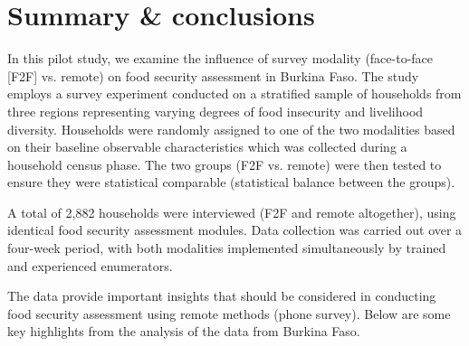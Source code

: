 \documentclass[11pt,harvard]{article}
\begin{document}
	
	\pagebreak
	
	
	\section{Summary \& conclusions}
	
	In this pilot study, we examine the influence of survey modality (face-to-face [F2F] vs. remote) on food security assessment in Burkina Faso. The study employs a survey experiment conducted on a stratified sample of households from three regions representing varying degrees of food insecurity and livelihood diversity. Households were randomly assigned to one of the two modalities based on their baseline observable characteristics which was collected during a household census phase. The two groups (F2F vs. remote) were then tested to ensure they were statistical comparable (statistical balance between the groups).

	A total of 2,882 households were interviewed (F2F and remote altogether), using identical food security assessment modules. Data collection was carried out over a four-week period, with both modalities implemented simultaneously by trained and experienced enumerators. 
	
	The data provide important insights that should be considered in conducting food security assessment using remote methods (phone survey). Below are some key highlights from the analysis of the data from Burkina Faso.
	
\end{document}
